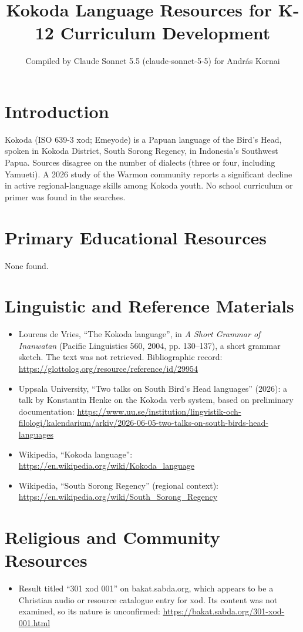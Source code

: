 \documentclass[12pt]{article}
\title{Kokoda Language Resources for K-12 Curriculum Development}
\author{Compiled by Claude Sonnet 5.5 (claude-sonnet-5-5) for Andr\'as Kornai}
\date{}
\begin{document}
\maketitle

\section{Introduction}
Kokoda (ISO 639-3 xod; Emeyode) is a Papuan language of the Bird's Head, spoken in Kokoda District, South Sorong Regency, in Indonesia's Southwest Papua. Sources disagree on the number of dialects (three or four, including Yamueti). A 2026 study of the Warmon community reports a significant decline in active regional-language skills among Kokoda youth. No school curriculum or primer was found in the searches.

\section{Primary Educational Resources}
None found.

\section{Linguistic and Reference Materials}
\begin{itemize}
\item Lourens de Vries, ``The Kokoda language'', in \emph{A Short Grammar of Inanwatan} (Pacific Linguistics 560, 2004, pp. 130--137), a short grammar sketch. The text was not retrieved. Bibliographic record: \url{https://glottolog.org/resource/reference/id/29954}
\item Uppsala University, ``Two talks on South Bird's Head languages'' (2026): a talk by Konstantin Henke on the Kokoda verb system, based on preliminary documentation: \url{https://www.uu.se/institution/lingvistik-och-filologi/kalendarium/arkiv/2026-06-05-two-talks-on-south-birds-head-languages}
\item Wikipedia, ``Kokoda language'': \url{https://en.wikipedia.org/wiki/Kokoda_language}
\item Wikipedia, ``South Sorong Regency'' (regional context): \url{https://en.wikipedia.org/wiki/South_Sorong_Regency}
\end{itemize}

\section{Religious and Community Resources}
\begin{itemize}
\item Result titled ``301 xod 001'' on bakat.sabda.org, which appears to be a Christian audio or resource catalogue entry for xod. Its content was not examined, so its nature is unconfirmed: \url{https://bakat.sabda.org/301-xod-001.html}
\end{itemize}
\end{document}
